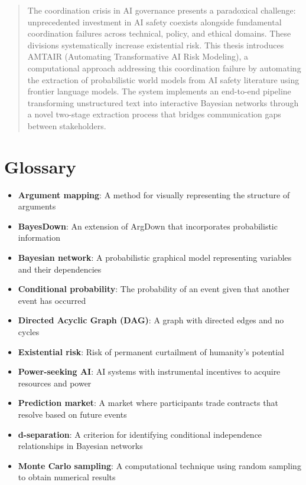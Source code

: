 \documentclass[
  11pt,
  letterpaper,
]{book}
\providecommand{\tightlist}{%
  \setlength{\itemsep}{0pt}\setlength{\parskip}{0pt}}
\begin{document}
\begin{quote}
The coordination crisis in AI governance presents a paradoxical
challenge: unprecedented investment in AI safety coexists alongside
fundamental coordination failures across technical, policy, and ethical
domains. These divisions systematically increase existential risk. This
thesis introduces AMTAIR (Automating Transformative AI Risk Modeling), a
computational approach addressing this coordination failure by
automating the extraction of probabilistic world models from AI safety
literature using frontier language models. The system implements an
end-to-end pipeline transforming unstructured text into interactive
Bayesian networks through a novel two-stage extraction process that
bridges communication gaps between stakeholders.
\end{quote}

\section*{Glossary}\label{glossary}


\begin{itemize}
\tightlist
\item
  \textbf{Argument mapping}: A method for visually representing the
  structure of arguments\\
\item
  \textbf{BayesDown}: An extension of ArgDown that incorporates
  probabilistic information\\
\item
  \textbf{Bayesian network}: A probabilistic graphical model
  representing variables and their dependencies\\
\item
  \textbf{Conditional probability}: The probability of an event given
  that another event has occurred\\
\item
  \textbf{Directed Acyclic Graph (DAG)}: A graph with directed edges and
  no cycles\\
\item
  \textbf{Existential risk}: Risk of permanent curtailment of humanity's
  potential\\
\item
  \textbf{Power-seeking AI}: AI systems with instrumental incentives to
  acquire resources and power\\
\item
  \textbf{Prediction market}: A market where participants trade
  contracts that resolve based on future events\\
\item
  \textbf{d-separation}: A criterion for identifying conditional
  independence relationships in Bayesian networks\\
\item
  \textbf{Monte Carlo sampling}: A computational technique using random
  sampling to obtain numerical results
\end{itemize}
\end{document}
